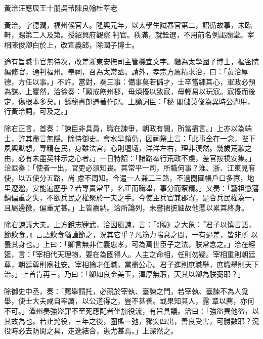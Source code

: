 
\begin{pinyinscope}

 黃洽汪應辰王十朋吳芾陳良翰杜莘老



 黃洽，字德潤，福州候官人。隆興元年，以太學生試春官第二，詔循故事，未臨軒，賜第二人及第。授紹興府觀察
 判官。秩滿，就銓選，不用前名例謁廟堂。宰相陳俊卿白於上，改宣義郎，除國子博士。



 適有旨職事官無待次，改差浙東安撫司主管機宜文字。繼為太學國子博士，樞密院編修官，通判福州。奉祠，召為太常丞。請外，孝宗方厲精求治，曰：「黃洽厚德，方任以事。」不許。當對，奏三事：備事莫若儲才，士卒當練其心，軍政必預為謀。上矍然，洽徐奏：「願戒飭州郡，毋煩擾以致寇，毋輕易以玩寇。寇擾而後定，傷根本多矣。」繇秘書郎遷著作郎。上諭詞臣：「秘
 閣儲英俊為異時公卿用，行黃洽詞，可及之。」



 除右正言，首奏：「諫臣非具員，職在諫爭，朝政有闕，所當盡言。」上亦以為端士，許其盡言無隱。除侍御史。會水旱頻仍，因祠祭上言：「此事全在一念，陛下夙興默想，專精在民，身雖法宮，心則壇壝，洋洋左右，理非漠然。幾歲荒歉之由，必有未盡契神示之心者。」一日特詔：「諸路奉行荒政不虔，差官按視安集。」洽亟奏：「使者一出，官吏必須知畏。其常平一司，所職何事？淮、浙、江東見有使，以五使分五路，尚
 慮不周知。今遣一人兼二三路，不過閱圖帳戶口多寡，地里遼邈，安能遍歷乎？若專責常平，名正而職舉，事分而察精。」又奏：「藝祖懲藩鎮偏重之失，不欲兵民之權聚於一夫之手。今使主兵官兼郡寄，是合兵民權為一，且屬邊徼，偏重尤甚。」上皆嘉納。洽所論列，未嘗捃摭細故他慝以累其終身。



 除右諫議大夫。上方銳志肄武，洽因風諫，言：「《頤》之大象：『君子以慎言語，節飲食。』言語飲食猶謹節之，況其它乎？凡筋力喘息之間，一有過差，皆非所
 以養其身也。」上曰：「卿言無非仁義忠孝，可為萬世臣子之法，朕常念之。」洽在經筵，言：「宰相代天理物，要在為國得人。人主之命相，任則勿疑。宰相重則朝廷尊，朝廷尊則廟社安。宰相掄才任職，當盡公心。君子進則庶職舉，庶職舉則天下治。」上首肯再三，乃曰：「卿如良金美玉，渾厚無瑕，天其以卿為朕弼耶？」



 除御史中丞，奏：「薦舉請托，必競於宰執、臺諫之門，若宰執、臺諫不為人覓舉，使士大夫咸自率厲，以公道得之，豈不甚善。或果知其人，露
 章以薦，亦何不可。」潭州奏強盜罪不至死應配者坐加役流，有旨具議。洽曰：「強盜異他盜，以其故為也。若止髡役，三年之後，圈檻一弛，豨突四出，善良受害，可勝數耶？況役時必去防閑之具，走逸結合，患尤甚焉。」上深然之。




\end{pinyinscope}
